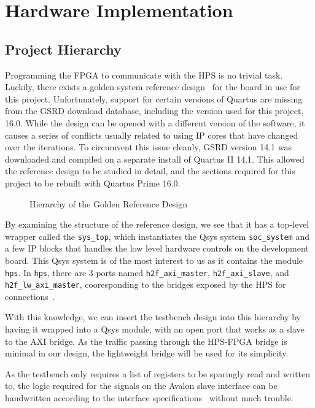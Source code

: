 \chapter{Hardware Implementation}

\section{Project Hierarchy}
Programming the FPGA to communicate with the HPS is no trivial task.
Luckily, there exists a golden system reference design~\cite{Rocket1} for the board in use for this project.
Unfortunately, support for certain versions of Quartus are missing from the GSRD download database, including the version used for this project, 16.0.
While the design can be opened with a different version of the software, it causes a series of conflicts usually related to using IP cores that have changed over the iterations.
To circumvent this issue cleanly, GSRD version 14.1 was downloaded and compiled on a separate install of Quartus II 14.1.
This allowed the reference design to be studied in detail, and the sections required for this project to be rebuilt with Quartus Prime 16.0.

\begin{figure}[H]
  \centering
  
  \caption{Hierarchy of the Golden Reference Design}
  \label{Golden Hierarchy}
\end{figure}

By examining the structure of the reference design, we see that it has a top-level wrapper called the \texttt{sys\_top}, which instantiates the Qsys system \texttt{soc\_system} and a few IP blocks that handles the low level hardware controls on the development board.
This Qsys system is of the most interest to us as it contains the module \texttt{hps}.
In \texttt{hps}, there are 3 ports named \texttt{h2f\_axi\_master}, \texttt{h2f\_axi\_slave}, and \texttt{h2f\_lw\_axi\_master}, cooresponding to the bridges exposed by the HPS for connections~\cite{Altera6}.

With this knowledge, we can insert the testbench design into this hierarchy by having it wrapped into a Qsys module, with an open port that works as a slave to the AXI bridge.
As the traffic passing through the HPS-FPGA bridge is minimal in our design, the lightweight bridge will be used for its simplicity.

As the testbench only requires a list of registers to be sparingly read and written to, the logic required for the signals on the Avalon slave interface can be handwritten according to the interface specifications~\cite{Intel3} without much trouble.

